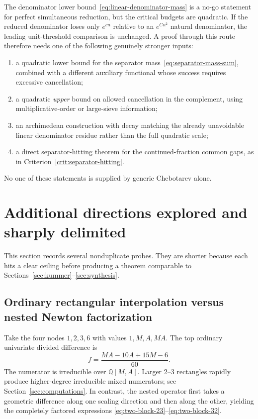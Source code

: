 \documentclass[11pt,oneside]{article}
\theoremstyle{definition}
\theoremstyle{remark}
\newcommand{\Q}{\mathbb Q}
\begin{document}
The denominator lower bound~\eqref{eq:linear-denominator-mass} is a no-go statement for
perfect simultaneous reduction, but the critical budgets are quadratic.  If the reduced
denominator loses only $e^{cn}$ relative to an $e^{Cn^2}$ natural denominator, the leading
unit-threshold comparison is unchanged.  A proof through this route therefore needs one of
the following genuinely stronger inputs:
\begin{enumerate}
\item a quadratic lower bound for the separator mass~\eqref{eq:separator-mass-sum}, combined
      with a different auxiliary functional whose success requires excessive cancellation;
\item a quadratic \emph{upper} bound on allowed cancellation in the complement, using
      multiplicative-order or large-sieve information;
\item an archimedean construction with decay matching the already unavoidable linear
      denominator residue rather than the full quadratic scale;
\item a direct separator-hitting theorem for the continued-fraction common gaps, as in
      Criterion~\ref{crit:separator-hitting}.
\end{enumerate}
No one of these statements is supplied by generic Chebotarev alone.

\section{Additional directions explored and sharply delimited}
\label{sec:other-routes}

This section records several nonduplicate probes.  They are shorter because each hits a clear
ceiling before producing a theorem comparable to Sections~\ref{sec:kummer}--\ref{sec:synthesis}.

\subsection{Ordinary rectangular interpolation versus nested Newton factorization}

Take the four nodes $1,2,3,6$ with values $1,M,A,MA$.  The top ordinary univariate divided
difference is
\begin{equation}
 [1,2,3,6]f
 =\frac{MA-10A+15M-6}{60}.
 \label{eq:rect-2x2}
\end{equation}
The numerator is irreducible over $\Q[M,A]$.  Larger $2$--$3$ rectangles rapidly produce
higher-degree irreducible mixed numerators; see Section~\ref{sec:computations}.  In contrast,
the nested operator first takes a geometric difference along one scaling direction and then
along the other, yielding the completely factored expressions
\eqref{eq:two-block-23}--\eqref{eq:two-block-32}.
\end{document}
